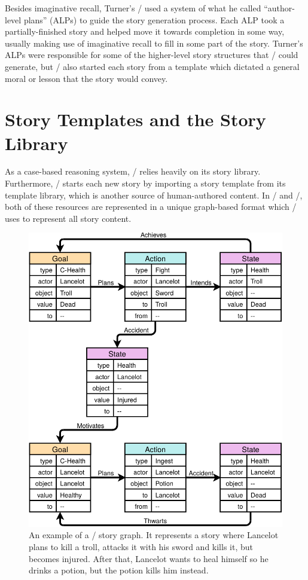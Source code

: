 Besides imaginative recall, Turner's \minstrel/ used a system of what he called ``author-level plans'' (ALPs) to guide the story generation process.
%
Each ALP took a partially-finished story and helped move it towards completion in some way, usually making use of imaginative recall to fill in some part of the story.
%
Turner's ALPs were responsible for some of the higher-level story structures that \minstrel/ could generate, but \minstrel/ also started each story from a template which dictated a general moral or lesson that the story would convey.

\section{Story Templates and the Story Library}

As a case-based reasoning system, \minstrel/ relies heavily on its story library.
%
Furthermore, \minstrel/ starts each new story by importing a story template from its template library, which is another source of human-authored content.
%
In \minstrel/ and \skald/, both of these resources are represented in a unique graph-based format which \minstrel/ uses to represent all story content.


\begin{figure}[!p]
  \centering
  \includegraphics[width=\textwidth]{fig/cropped-story-graph.pdf}
  \caption[Example Skald story graph]{An example of a \skald/ story graph. It represents a story where Lancelot plans to kill a troll, attacks it with his sword and kills it, but becomes injured. After that, Lancelot wants to heal himself so he drinks a potion, but the potion kills him instead.}
\label{fig:story-graph}
\end{figure}


